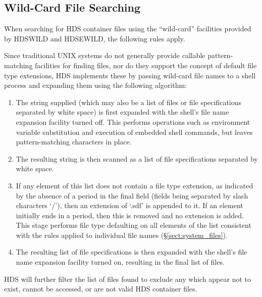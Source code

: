\documentclass[twoside,11pt]{article}
\newcommand{\htmlref}[2]{#1}
\newcommand{\xlabel}[1]{}
\renewcommand{\_}{\texttt{\symbol{95}}}
\newcommand{\qt}[1]{``#1''}
\newcommand{\qt}[1]{{\tt{"}}#1{\tt{"}}}
\begin{document}
\subsection{\xlabel{wild_card_file_searching}\label{sect:system_wild}Wild-Card File Searching}

When searching for HDS container files using the \qt{wild-card}
facilities provided by \htmlref{HDS\_WILD}{HDS_WILD} and
\htmlref{HDS\_EWILD}{HDS_EWILD}, the following rules apply.

Since traditional UNIX systems do not generally provide callable
pattern-matching facilities for finding files, nor do they support the
concept of default file type extensions, HDS implements these by
passing wild-card file names to a shell process and expanding them
using the following algorithm:

\begin{enumerate}

\item
The string supplied (which may also be a list of files or file
specifications separated by white space) is first expanded with the
shell's file name expansion facility turned off. This performs
operations such as environment variable substitution and execution of
embedded shell commands, but leaves pattern-matching characters in
place.

\item
The resulting string is then scanned as a list of file specifications
separated by white space.

\item
If any element of this list does not contain a file type extension, as
indicated by the absence of a period in the final field (fields being
separated by slash characters `/'), then an extension of `.sdf' is
appended to it. If an element initially ends in a period, then this is
removed and no extension is added. This stage performs file type
defaulting on all elements of the list consistent with the rules
applied to individual file names (\S\ref{sect:system_files}).

\item
The resulting list of file specifications is then expanded with the
shell's file name expansion facility turned on, resulting in the final
list of files.

\end{enumerate}

HDS will further filter the list of files found to exclude any which
appear not to exist, cannot be accessed, or are not valid HDS
container files.
\end{document}

